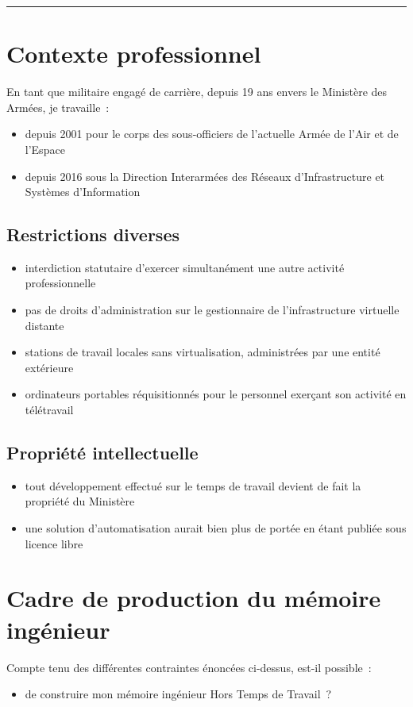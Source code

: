 \documentclass[10pt]{article}
\newcommand{\hr}{\rule{\textwidth}{1pt}}
\newenvironment{itmz}{\begin{itemize}
\setlength{\itemsep}{0em}
}{\end{itemize}}
\begin{document}
\hr

\appendix

\section{Contexte professionnel}

En tant que militaire engagé de carrière, depuis 19 ans envers le Ministère des Armées, je travaille :
\begin{itmz}
\item{depuis 2001 pour le corps des sous-officiers de l’actuelle Armée de l’Air et de l’Espace}
\item{depuis 2016 sous la Direction Interarmées des Réseaux d’Infrastructure et Systèmes d’Information}
\end{itmz}

\subsection{Restrictions diverses}

\begin{itmz}
\item{interdiction statutaire d’exercer simultanément une autre activité professionnelle}
\item{pas de droits d’administration sur le gestionnaire de l’infrastructure virtuelle distante}
\item{stations de travail locales sans virtualisation, administrées par une entité extérieure}
\item{ordinateurs portables réquisitionnés pour le personnel exerçant son activité en télétravail}
\end{itmz}

\subsection{Propriété intellectuelle}

\begin{itmz}
\item{tout développement effectué sur le temps de travail devient de fait la propriété du Ministère}
\item{une solution d’automatisation aurait bien plus de portée en étant publiée sous licence libre}
\end{itmz}

\section{Cadre de production du mémoire ingénieur}

Compte tenu des différentes contraintes énoncées ci-dessus, est-il possible :
\begin{itmz}
\item{de construire mon mémoire ingénieur Hors Temps de Travail ?}
\end{itmz}
\end{document}
